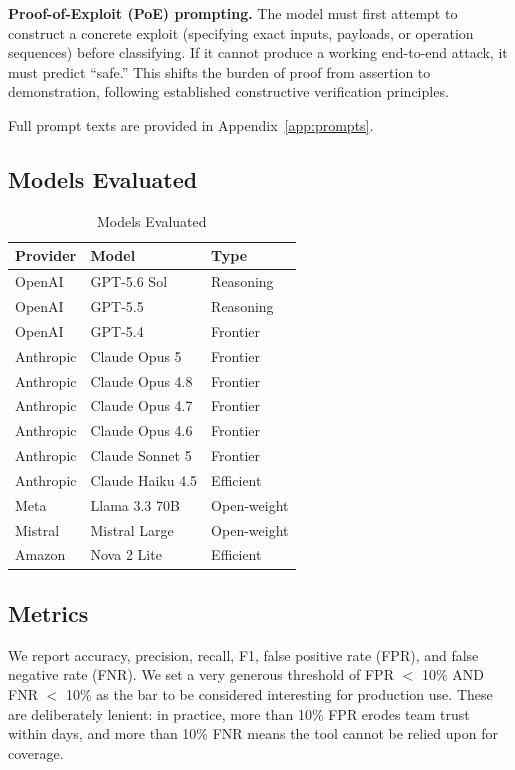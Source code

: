 \documentclass[conference]{IEEEtran}
\begin{document}
\textbf{Proof-of-Exploit (PoE) prompting.} The model must first attempt to construct a concrete exploit (specifying exact inputs, payloads, or operation sequences) before classifying. If it cannot produce a working end-to-end attack, it must predict ``safe.'' This shifts the burden of proof from assertion to demonstration, following established constructive verification principles.

Full prompt texts are provided in Appendix~\ref{app:prompts}.

\subsection{Models Evaluated}

\begin{table}[h]
\centering
\caption{Models Evaluated}
\begin{tabular}{lll}
\toprule
\textbf{Provider} & \textbf{Model} & \textbf{Type} \\
\midrule
OpenAI & GPT-5.6 Sol & Reasoning \\
OpenAI & GPT-5.5 & Reasoning \\
OpenAI & GPT-5.4 & Frontier \\
Anthropic & Claude Opus 5 & Frontier \\
Anthropic & Claude Opus 4.8 & Frontier \\
Anthropic & Claude Opus 4.7 & Frontier \\
Anthropic & Claude Opus 4.6 & Frontier \\
Anthropic & Claude Sonnet 5 & Frontier \\
Anthropic & Claude Haiku 4.5 & Efficient \\
Meta & Llama 3.3 70B & Open-weight \\
Mistral & Mistral Large & Open-weight \\
Amazon & Nova 2 Lite & Efficient \\
\bottomrule
\end{tabular}
\label{tab:models}
\end{table}

\subsection{Metrics}

We report accuracy, precision, recall, F1, false positive rate (FPR), and false negative rate (FNR). We set a very generous threshold of FPR $<$ 10\% AND FNR $<$ 10\% as the bar to be considered interesting for production use. These are deliberately lenient: in practice, more than 10\% FPR erodes team trust within days, and more than 10\% FNR means the tool cannot be relied upon for coverage.
\end{document}
